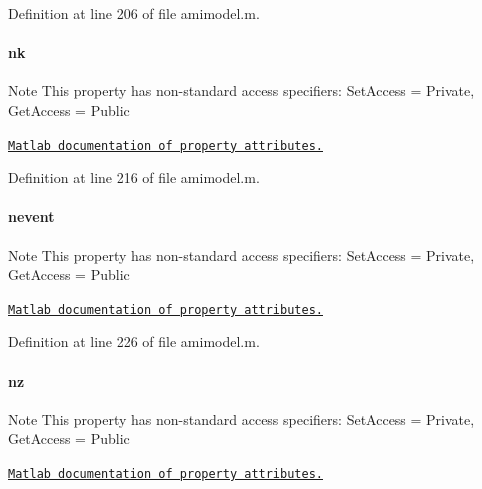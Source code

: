 Definition at line 206 of file amimodel.\+m.

\hypertarget{classamimodel_afd6bea572754e0c3c320664bdccf0200}{}
\paragraph[{nk}]{\setlength{\rightskip}{0pt plus 5cm}nk}\label{classamimodel_afd6bea572754e0c3c320664bdccf0200}
\begin{DoxyNote}{Note}
This property has non-\/standard access specifiers\+: {\ttfamily Set\+Access = Private, Get\+Access = Public} 

\href{http://www.mathworks.com/help/matlab/matlab_oop/property-attributes.html}{\tt Matlab documentation of property attributes.} 
\end{DoxyNote}


Definition at line 216 of file amimodel.\+m.

\hypertarget{classamimodel_aab5c7f06273122b68624eb3bca6a9b6e}{}
\paragraph[{nevent}]{\setlength{\rightskip}{0pt plus 5cm}nevent}\label{classamimodel_aab5c7f06273122b68624eb3bca6a9b6e}
\begin{DoxyNote}{Note}
This property has non-\/standard access specifiers\+: {\ttfamily Set\+Access = Private, Get\+Access = Public} 

\href{http://www.mathworks.com/help/matlab/matlab_oop/property-attributes.html}{\tt Matlab documentation of property attributes.} 
\end{DoxyNote}


Definition at line 226 of file amimodel.\+m.

\hypertarget{classamimodel_a79f11413e5bfe18a0e71e17574399ad5}{}
\paragraph[{nz}]{\setlength{\rightskip}{0pt plus 5cm}nz}\label{classamimodel_a79f11413e5bfe18a0e71e17574399ad5}
\begin{DoxyNote}{Note}
This property has non-\/standard access specifiers\+: {\ttfamily Set\+Access = Private, Get\+Access = Public} 

\href{http://www.mathworks.com/help/matlab/matlab_oop/property-attributes.html}{\tt Matlab documentation of property attributes.} 
\end{DoxyNote}



